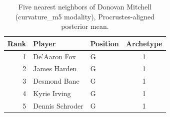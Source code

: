 \begin{table}[htbp]
  \centering\small
  \begin{tabular}{rllc}
    \toprule
    Rank & Player & Position & Archetype \\
    \midrule
    1 & De'Aaron Fox & G & 1 \\
    2 & James Harden & G & 1 \\
    3 & Desmond Bane & G & 1 \\
    4 & Kyrie Irving & G & 1 \\
    5 & Dennis Schroder & G & 1 \\
    \bottomrule
  \end{tabular}
  \caption{Five nearest neighbors of Donovan Mitchell (curvature_m5 modality), Procrustes-aligned posterior mean.}
  \label{tab:Donovan_Mitchell_neighbors_curvature_m5}
\end{table}

